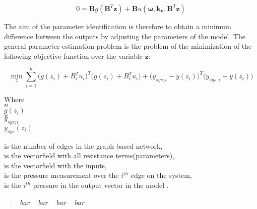 \begin{equation}
 0 = \pmb{B} g(\pmb{B}^T \pmb{z})+ \pmb{B} u(\pmb{\omega},\pmb{k_v}, \pmb{B}^T \pmb{z})
 \label{InputOutputmodel_steadystate}
\end{equation}

The aim of the parameter identification is therefore to obtain a minimum difference between the outputs by adjusting the parameters of the model. The general parameter estimation problem is the problem of the minimization of the following objective function over the variable $\pmb{z}$: 

%
%

 \begin{equation}
 \min_{z} \sum_{i=1}^{n}\Big(g(z_i) + B_i^Tu_i\Big)^T \Big(g(z_i)     + B_i^Tu_i\Big) + \big(y_{sys;i} - y(z_i)\big)^T  \big(y_{sys;i} - y(z_i)\big)
  \label{ObjectiveFunction}
 \end{equation}
 
\begin{minipage}[t]{0.20\textwidth}
Where\\
\hspace*{8mm} $n$ \\
\hspace*{8mm} $g(z_i)$ \\
\hspace*{8mm} $u$ \\
\hspace*{8mm} $y_{sys;i}$ \\
\hspace*{8mm} $y_{sys}(z_i)$ 
\end{minipage}
\begin{minipage}[t]{0.68\textwidth}
\vspace*{2mm}
is the number of edges in the graph-based network,\\
is the vectorfield with all resistance terms(parameters),\\
is the vectorfield with the inputs,\\
is the pressure measurement over the $i^{th}$ edge on the system,\\
is the $i^{th}$ pressure in the output vector in the model .
\end{minipage}
\begin{minipage}[t]{0.10\textwidth}
\vspace*{2mm}
\textcolor{White}{te}$\unit{\cdot}$
\textcolor{White}{te}$\unit{bar}$
\textcolor{White}{te}$\unit{bar}$
\textcolor{White}{te}$\unit{bar}$
\textcolor{White}{te}$\unit{bar}$
\end{minipage}
